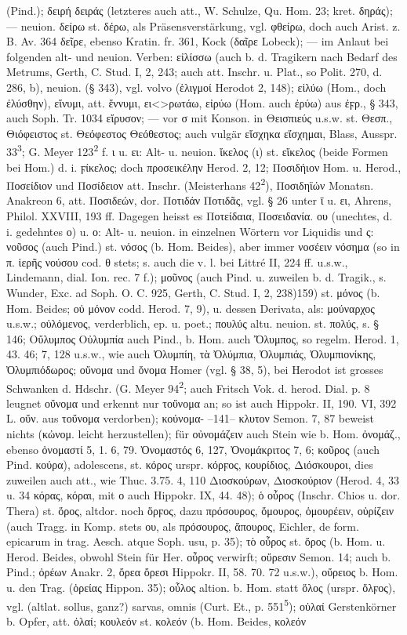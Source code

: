 (Pind.); δειρή δειράς (letzteres auch att., W. Schulze, Qu. Hom. 23; kret. δηράς); — neuion. δείρω st. δέρω, als Präsensverstärkung, vgl. φθείρω, doch auch Arist. z. B. Av. 364 δεῖρε, ebenso Kratin. fr. 361, Kock (δαῖρε Lobeck); — im Anlaut bei folgenden alt- und neuion. Verben: εἰλίσσω (auch b. d. Tragikern nach Bedarf des Metrums, Gerth, C. Stud. I, 2, 243; auch att. Inschr. u. Plat., so Polit. 270, d. 286, b), neuion. (§ 343), vgl. volvo (ἑλιγμοί Herodot 2, 148); εἰλύω (Hom., doch ἐλύσθην), εἵνυμι, att. ἕννυμι, ει<>ρωτάω, εἰρύω (Hom. auch ἐρύω) aus ἐϝρ., § 343, auch Soph. Tr. 1034 εἴρυσον; —  vor σ mit Konson. in Θεισπιεύς u.s.w. st. Θεσπ., Θιόφειστος st. Θεόφεστος Θεόθεστος; auch vulgär εἴσχηκα εἴσχημαι, Blass, Ausspr. 33\textsuperscript{3}; G. Meyer 123\textsuperscript{2} f. ι u. ει: Alt- u. neuion. ἴκελος (ι) st. εἴκελος (beide Formen bei Hom.) d. i. ϝίκελος; doch προσεικέλην Herod. 2, 12; Ποσιδήιον Hom. u. Herod., Ποσείδιον und Ποσίδειον att. Inschr. (Meisterhans 42\textsuperscript{2}), Ποσιδηϊών Monatsn. Anakreon 6, att. Ποσιδεών, dor. Ποτιδάν Ποτιδᾶς, vgl. § 26 unter ῑ u. ει, Ahrens, Philol. XXVIII, 193 ff. Dagegen heisst es Ποτείδαια, Ποσειδανία. ου (unechtes, d. i. gedehntes ο) u. ο: Alt- u. neuion. in einzelnen Wörtern vor Liquidis und ς: νοῦσος (auch Pind.) st. νόσος (b. Hom. Beides), aber immer νοσέειν νόσημα (so in π. ἱερῆς νούσου cod. θ stets; s. auch die v. l. bei Littré II, 224 ff. u.s.w., Lindemann, dial. Ion. rec. 7 f.); μοῦνος (auch Pind. u. zuweilen b. d. Tragik., s. Wunder, Exc. ad Soph. O. C. 925, Gerth, C. Stud. I, 2, 238)159) st. μόνος (b. Hom. Beides; οὐ μόνον codd. Herod. 7, 9), u. dessen Derivata, als: μούναρχος u.s.w.; οὐλόμενος, verderblich, ep. u. poet.; πουλύς altu. neuion. st. πολύς, s. § 146; Οὔλυμπος Οὐλυμπία auch Pind., b. Hom. auch Ὄλυμπος, so regelm. Herod. 1, 43. 46; 7, 128 u.s.w., wie auch Ὀλυμπίη, τὰ Ὀλύμπια, Ὀλυμπιάς, Ὀλυμπιονίκης, Ὀλυμπιόδωρος; οὔνομα und ὄνομα Homer (vgl. § 38, 5), bei Herodot ist grosses Schwanken d. Hdschr. (G. Meyer 94\textsuperscript{2}; auch Fritsch Vok. d. herod. Dial. p. 8 leugnet οὔνομα und erkennt nur τοὔνομα an; so ist auch Hippokr. II, 190. VI, 392 L. οὔν. aus τοὔνομα verdorben); κοὐνομα- --141-- κλυτον Semon. 7, 87 beweist nichts (κὠνομ. leicht herzustellen); für οὐνομάζειν auch Stein wie b. Hom. ὀνομάζ., ebenso ὀνομαστί 5, 1. 6, 79. Ὀνομαστός 6, 127, Ὀνομάκριτος 7, 6; κοῦρος (auch Pind. κούρα), adolescens, st. κόρος urspr. κόρϝος, κουρίδιος, Διόσκουροι, dies zuweilen auch att., wie Thuc. 3.75. 4, 110 Διοσκούρων, Διοσκούριον (Herod. 4, 33 u. 34 κόρας, κόραι, mit ο auch Hippokr. IX, 44. 48); ὁ οὖρος (Inschr. Chios u. dor. Thera) st. ὅρος, altdor. noch ὅρϝος, dazu πρόσουρος, ὅμουρος, ὁμουρέειν, οὐρίζειν (auch Tragg. in Komp. stets ου, als πρόσουρος, ἄπουρος, Eichler, de form. epicarum in trag. Aesch. atque Soph. usu, p. 35); τὸ οὖρος st. ὄρος (b. Hom. u. Herod. Beides, obwohl Stein für Her. οὖρος verwirft; οὔρεσιν Semon. 14; auch b. Pind.; ὀρέων Anakr. 2, ὄρεα ὄρεσι Hippokr. II, 58. 70. 72 u.s.w.), οὔρειος b. Hom. u. den Trag. (ὀρείας Hippon. 35); οὖλος altion. b. Hom. statt ὅλος (urspr. ὅλϝος), vgl. (altlat. sollus, ganz?) sarvas, omnis (Curt. Et., p. 551\textsuperscript{5}); οὐλαί Gerstenkörner b. Opfer, att. ὀλαί; κουλεόν st. κολεόν (b. Hom. Beides, κολεόν 